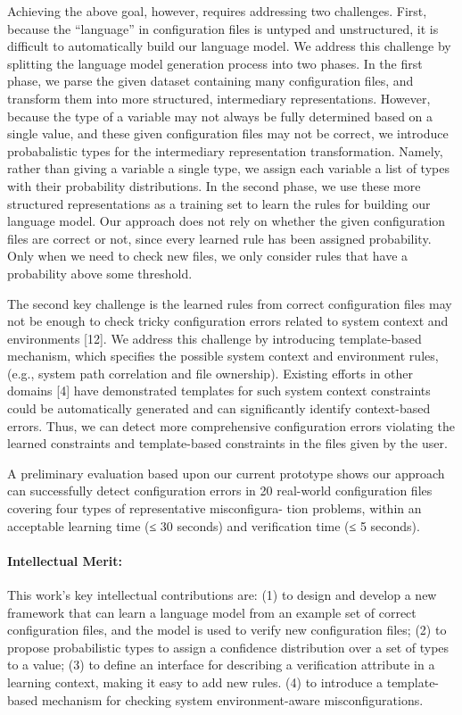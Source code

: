 Achieving the above goal, however, requires addressing two challenges. 
First, because the “language” in configuration files is untyped and unstructured, it is difficult to automatically build our language model. 
We address this challenge by splitting the language model generation process into two phases. 
In the first phase, we parse the given dataset containing many configuration files, and transform them into more structured, intermediary representations. 
However, because the type of a variable may not always be fully determined based on a single value, and these given configuration files may not be correct, we introduce probabalistic types for the intermediary representation transformation. 
Namely, rather than giving a variable a single type, we assign each variable a list of types with their probability distributions. 
In the second phase, we use these more structured representations as a training set to learn the rules for building our language model. 
Our approach does not rely on whether the given configuration files are correct or not, since every learned rule has been assigned probability. 
Only when we need to check new files, we only consider rules that have a probability above some threshold.

The second key challenge is the learned rules from correct configuration files may not be enough to check tricky configuration errors related to system context and environments [12]. 
We address this challenge by introducing template-based mechanism, which specifies the possible system context and environment rules, (e.g., system path correlation and file ownership).
Existing efforts in other domains [4] have demonstrated templates for such system context constraints could be automatically generated and can significantly identify context-based errors. 
Thus, we can detect more comprehensive configuration errors violating the learned constraints and template-based constraints in the files given by the user.

A preliminary evaluation based upon our current prototype shows our approach can successfully detect configuration errors in 20 real-world configuration files covering four types of representative misconfigura- tion problems, within an acceptable learning time (≤ 30 seconds) and verification time (≤ 5 seconds).

\paragraph{Intellectual Merit:} This work’s key intellectual contributions are: (1) to design and develop a new framework that can learn a language model from an example set of correct configuration files, and the model is used to verify new configuration files; (2) to propose probabilistic types to assign a confidence distribution over a set of types to a value; (3) to define an interface for describing a verification attribute in a learning context, making it easy to add new rules. 
(4) to introduce a template-based mechanism for checking system environment-aware misconfigurations.

